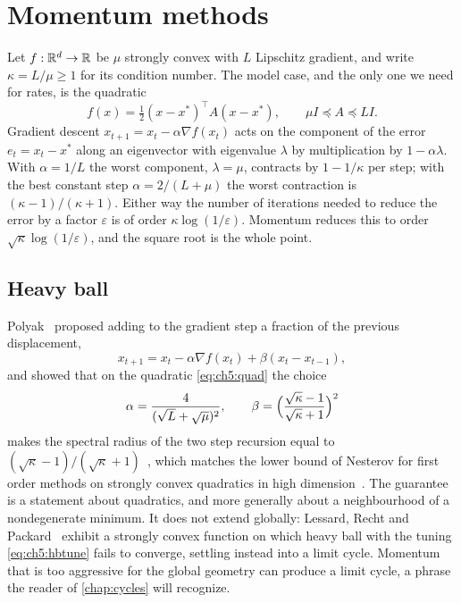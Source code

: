 \section{Momentum methods}\label{sec:ch5:momentum}

Let $f:\mathbb{R}^d\to\mathbb{R}$ be $\mu$ strongly convex with $L$ Lipschitz gradient, and
write $\kappa=L/\mu\ge1$ for its condition number.  The model case, and the
only one we need for rates, is the quadratic
\begin{equation}\label{eq:ch5:quad}
  f(x)=\tfrac12(x-x^\ast)^{\top}A(x-x^\ast),\qquad
  \mu I\preceq A\preceq LI .
\end{equation}
Gradient descent $x_{t+1}=x_t-\alpha\nabla f(x_t)$ acts on the component of
the error $e_t=x_t-x^\ast$ along an eigenvector with eigenvalue $\lambda$ by
multiplication by $1-\alpha\lambda$.  With $\alpha=1/L$ the worst component,
$\lambda=\mu$, contracts by $1-1/\kappa$ per step; with the best constant step
$\alpha=2/(L+\mu)$ the worst contraction is $(\kappa-1)/(\kappa+1)$.  Either
way the number of iterations needed to reduce the error by a factor
$\varepsilon$ is of order $\kappa\log(1/\varepsilon)$.  Momentum reduces this to
order $\sqrt\kappa\log(1/\varepsilon)$, and the square root is the whole point.

\subsection{Heavy ball}

Polyak~\cite{polyak1964} proposed adding to the gradient step a fraction of the
previous displacement,
\begin{equation}\label{eq:ch5:hb}
  x_{t+1}=x_t-\alpha\nabla f(x_t)+\beta(x_t-x_{t-1}),
\end{equation}
and showed that on the quadratic \eqref{eq:ch5:quad} the choice
\begin{equation}\label{eq:ch5:hbtune}
  \alpha=\frac{4}{(\sqrt L+\sqrt\mu)^2},\qquad
  \beta=\Bigl(\frac{\sqrt\kappa-1}{\sqrt\kappa+1}\Bigr)^2
\end{equation}
makes the spectral radius of the two step recursion equal to
$(\sqrt\kappa-1)/(\sqrt\kappa+1)$~\cite{polyak1987}, which matches the lower
bound of Nesterov for first order methods on strongly convex quadratics in
high dimension~\cite{nesterov2004}.  The guarantee is a statement about
quadratics, and more generally about a neighbourhood of a nondegenerate
minimum.  It does not extend globally: Lessard, Recht and
Packard~\cite{lessard2016} exhibit a strongly convex function on which heavy
ball with the tuning \eqref{eq:ch5:hbtune} fails to converge, settling
instead into a limit cycle.  Momentum that is too aggressive for the global geometry
can produce a limit cycle, a phrase the reader of \cref{chap:cycles} will
recognize.

